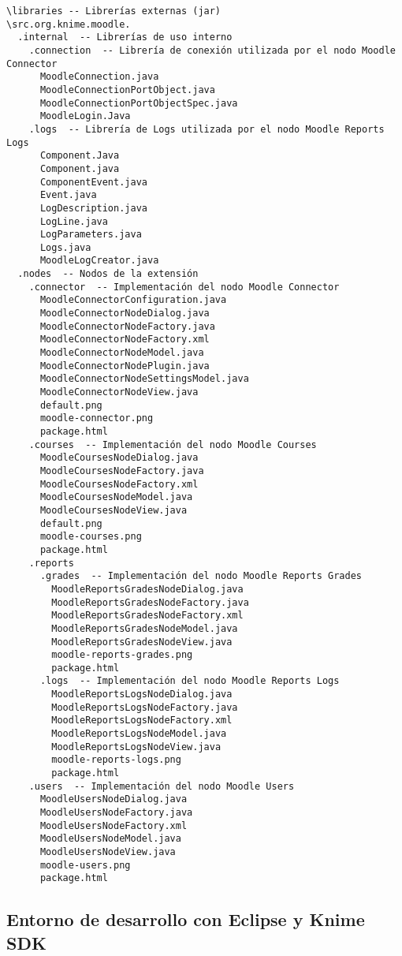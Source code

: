 \begin{verbatim} 
\libraries -- Librerías externas (jar)
\src.org.knime.moodle.
  .internal  -- Librerías de uso interno
    .connection  -- Librería de conexión utilizada por el nodo Moodle Connector
      MoodleConnection.java
      MoodleConnectionPortObject.java
      MoodleConnectionPortObjectSpec.java
      MoodleLogin.Java
    .logs  -- Librería de Logs utilizada por el nodo Moodle Reports Logs
      Component.Java
      Component.java
      ComponentEvent.java
      Event.java
      LogDescription.java
      LogLine.java
      LogParameters.java
      Logs.java
      MoodleLogCreator.java
  .nodes  -- Nodos de la extensión
    .connector  -- Implementación del nodo Moodle Connector
      MoodleConnectorConfiguration.java
      MoodleConnectorNodeDialog.java
      MoodleConnectorNodeFactory.java
      MoodleConnectorNodeFactory.xml
      MoodleConnectorNodeModel.java
      MoodleConnectorNodePlugin.java
      MoodleConnectorNodeSettingsModel.java
      MoodleConnectorNodeView.java
      default.png
      moodle-connector.png
      package.html
    .courses  -- Implementación del nodo Moodle Courses
      MoodleCoursesNodeDialog.java
      MoodleCoursesNodeFactory.java
      MoodleCoursesNodeFactory.xml
      MoodleCoursesNodeModel.java
      MoodleCoursesNodeView.java
      default.png
      moodle-courses.png
      package.html
    .reports
      .grades  -- Implementación del nodo Moodle Reports Grades
        MoodleReportsGradesNodeDialog.java
        MoodleReportsGradesNodeFactory.java
        MoodleReportsGradesNodeFactory.xml
        MoodleReportsGradesNodeModel.java
        MoodleReportsGradesNodeView.java
        moodle-reports-grades.png
        package.html
      .logs  -- Implementación del nodo Moodle Reports Logs
        MoodleReportsLogsNodeDialog.java
        MoodleReportsLogsNodeFactory.java
        MoodleReportsLogsNodeFactory.xml
        MoodleReportsLogsNodeModel.java
        MoodleReportsLogsNodeView.java
        moodle-reports-logs.png
        package.html
    .users  -- Implementación del nodo Moodle Users
      MoodleUsersNodeDialog.java
      MoodleUsersNodeFactory.java
      MoodleUsersNodeFactory.xml
      MoodleUsersNodeModel.java
      MoodleUsersNodeView.java
      moodle-users.png
      package.html
\end{verbatim}



\subsection{Entorno de desarrollo con Eclipse y Knime SDK}

